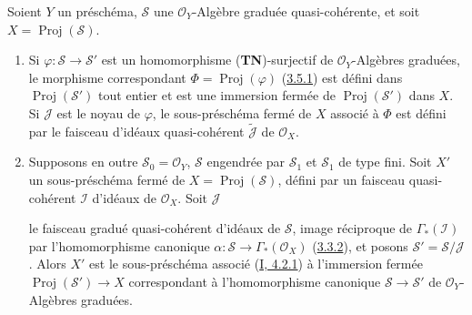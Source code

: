 \begin{proposition}[3.6.2]
\label{II.3.6.2-fr}
Soient $Y$ un préschéma, $\mathcal{S}$ une $\mathcal{O}_Y$-Algèbre graduée
quasi-cohérente, et soit $X=\operatorname{Proj}(\mathcal{S})$.
\begin{enumerate}
  \item[\rm(i)] Si $\varphi:\mathcal{S}\to\mathcal{S}'$ est un
    homomorphisme (\textbf{TN})-surjectif de $\mathcal{O}_Y$-Algèbres
    graduées, le morphisme correspondant
    $\Phi=\operatorname{Proj}(\varphi)$
    (\hyperref[II.3.5.1-fr]{3.5.1}) est défini dans
    $\operatorname{Proj}(\mathcal{S}')$ tout entier et est une immersion
    fermée de $\operatorname{Proj}(\mathcal{S}')$ dans $X$. Si $\mathcal{J}$
    est le noyau de $\varphi$, le sous-préschéma fermé de $X$ associé à
    $\Phi$ est défini par le faisceau d'idéaux quasi-cohérent
    $\widetilde{\mathcal{J}}$ de $\mathcal{O}_X$.
  \item[\rm(ii)] Supposons en outre $\mathcal{S}_0=\mathcal{O}_Y$,
    $\mathcal{S}$ engendrée par $\mathcal{S}_1$ et $\mathcal{S}_1$ de type
    fini. Soit $X'$ un sous-préschéma fermé de
    $X=\operatorname{Proj}(\mathcal{S})$, défini par un faisceau
    quasi-cohérent $\mathcal{I}$ d'idéaux de $\mathcal{O}_X$. Soit
    $\mathcal{J}$


    le faisceau gradué quasi-cohérent d'idéaux de $\mathcal{S}$, image
    réciproque de $\Gamma_*(\mathcal{I})$ par l'homomorphisme canonique
    $\alpha:\mathcal{S}\to\Gamma_*(\mathcal{O}_X)$
    (\hyperref[II.3.3.2-fr]{3.3.2}), et posons
    $\mathcal{S}'=\mathcal{S}/\mathcal{J}$. Alors $X'$ est le sous-préschéma
    associé (\hyperref[I.4.2.1-fr]{I, 4.2.1}) à l'immersion fermée
    $\operatorname{Proj}(\mathcal{S}')\to X$ correspondant à l'homomorphisme
    canonique $\mathcal{S}\to\mathcal{S}'$ de $\mathcal{O}_Y$-Algèbres
    graduées.
\end{enumerate}
\end{proposition}

